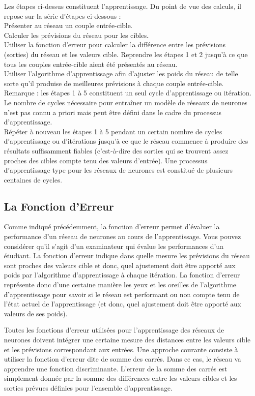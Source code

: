 \documentclass[11pt]{report}
\begin{document}
Les étapes ci-dessus constituent l'apprentissage. Du point de vue des calculs, il repose sur la série d'étapes ci-dessous :
\\
Présenter au réseau un couple entrée-cible.
\\
Calculer les prévisions du réseau pour les cibles.
\\
Utiliser la fonction d'erreur pour calculer la différence entre les prévisions (sorties) du réseau et les valeurs cible. Reprendre les étapes 1 et 2 jusqu'à ce que tous les couples entrée-cible aient été présentés au réseau.
\\
Utiliser l'algorithme d'apprentissage afin d'ajuster les poids du réseau de telle sorte qu'il produise de meilleures prévisions à chaque couple entrée-cible. Remarque : les étapes 1 à 5 constituent un seul cycle d'apprentissage ou itération. Le nombre de cycles nécessaire pour entraîner un modèle de réseaux de neurones n'est pas connu a priori mais peut être défini dans le cadre du processus d'apprentissage.
\\
Répéter à nouveau les étapes 1 à 5 pendant un certain nombre de cycles d'apprentissage ou d'itérations jusqu'à ce que le réseau commence à produire des résultats suffisamment fiables (c'est-à-dire des sorties qui se trouvent assez proches des cibles compte tenu des valeurs d'entrée). Une processus d'apprentissage type pour les réseaux de neurones est constitué de plusieurs centaines de cycles.
\subsection{La Fonction d'Erreur}


Comme indiqué précédemment, la fonction d'erreur permet d'évaluer la performance d'un réseau de neurones au cours de l'apprentissage. Vous pouvez considérer qu'il s'agit d'un examinateur qui évalue les performances d'un étudiant. La fonction d'erreur indique dans quelle mesure les prévisions du réseau sont proches des valeurs cible et donc, quel ajustement doit être apporté aux poids par l'algorithme d'apprentissage à chaque itération. La fonction d'erreur représente donc d'une certaine manière les yeux et les oreilles de l'algorithme d'apprentissage pour savoir si le réseau est performant ou non compte tenu de l'état actuel de l'apprentissage (et donc, quel ajustement doit être apporté aux valeurs de ses poids).

Toutes les fonctions d'erreur utilisées pour l'apprentissage des réseaux de neurones doivent intégrer une certaine mesure des distances entre les valeurs cible et les prévisions correspondant aux entrées. Une approche courante consiste à utiliser la fonction d'erreur dite de somme des carrés. Dans ce cas, le réseau va apprendre une fonction discriminante. L'erreur de la somme des carrés est simplement donnée par la somme des différences entre les valeurs cibles et les sorties prévues définies pour l'ensemble d'apprentissage.
\end{document}

